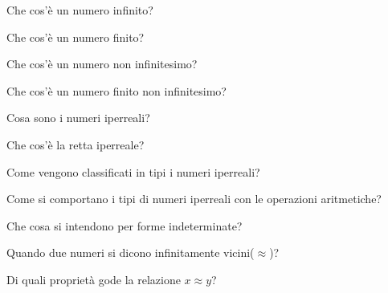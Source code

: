 \begin{multicols}{2}
\begin{esercizio}\label{ese:iper_009}
Che cos'è un numero infinito?
\end{esercizio}

\begin{esercizio}\label{ese:iper_010}
Che cos'è un numero finito?
\end{esercizio}

\begin{esercizio}\label{ese:iper_011}
Che cos'è un numero non infinitesimo?
\end{esercizio}

\begin{esercizio}\label{ese:iper_012}
Che cos'è un numero finito non infinitesimo?
\end{esercizio}

\begin{esercizio}\label{ese:iper_013}
Cosa sono i numeri iperreali?
\end{esercizio}

\begin{esercizio}\label{ese:iper_014}
Che cos'è la retta iperreale?
\end{esercizio}

\begin{esercizio}\label{ese:iper_015}
Come vengono classificati in tipi i numeri iperreali?
\end{esercizio}

\begin{esercizio}\label{ese:iper_016}
Come si comportano i tipi di numeri iperreali con le operazioni aritmetiche?
\begin{description} [nosep]
 \item [Addizione/sottrazione:]
 \item [Moltiplicazione:]
 \item [Reciproco:]
 \item [Divisione:]
\end{description}
\end{esercizio}

\begin{esercizio}\label{ese:iper_017}
Che cosa si intendono per forme indeterminate?
\end{esercizio}

\begin{esercizio}\label{ese:iper_018}
Quando due numeri si dicono infinitamente vicini(\(\approx\))?
\end{esercizio}

\begin{esercizio}\label{ese:iper_019}
Di quali proprietà gode la relazione \(x \approx y\)?
\end{esercizio}


\end{multicols}

